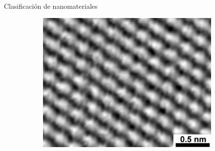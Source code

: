 \documentclass[aspectratio=169]{beamer}
\begin{document}
\begin{frame}{Clasificación de nanomateriales}
\begin{figure}
\begin{subfigure}[b]{0.15\textwidth}
				\caption{}
				\label{fig:graphite_image}
			\end{subfigure}
			\begin{subfigure}[b]{0.15\textwidth}
				\caption{}
				\label{fig:graphene_struct}
			\end{subfigure}
			\begin{subfigure}[b]{0.15\textwidth}
				\includegraphics[width=\textwidth]{graphene_image.jpg}
				\caption{}
				\label{fig:graphene_image}
			\end{subfigure}

\end{figure}
\end{frame}
\end{document}
